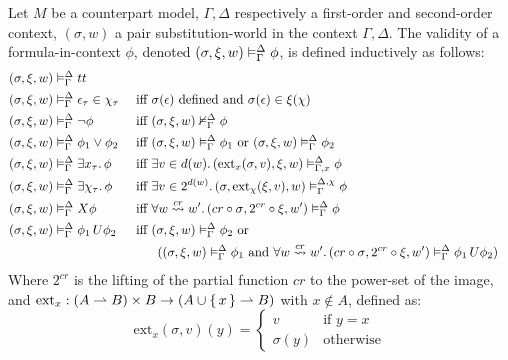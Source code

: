 \begin{definition}
Let $M$ be a counterpart model, $\Gamma,\Delta$ respectively a first-order and second-order context, $(\sigma, w)$ a
pair substitution-world in the context $\Gamma,\Delta$.
The validity of a formula-in-context $\phi$, denoted $({\sigma}, {\xi}, {w}) \vDash_{\Gamma}^{\Delta} {\phi}$, is defined inductively as follows:
\begin{align*}
  (\sigma, \xi, w) &\vDash_\Gamma^\Delta tt \\
  (\sigma, \xi, w) &\vDash_\Gamma^\Delta \epsilon_\tau \in \chi_\tau
      &&\text{ iff $\sigma(\epsilon)$ defined and } \sigma(\epsilon) \in \xi(\chi) \\
  (\sigma, \xi, w) &\vDash_\Gamma^\Delta \neg\phi
      &&\text{ iff } ({\sigma}, {\xi}, {w}) \nvDash_{\Gamma}^{\Delta} {\phi} \\
  (\sigma, \xi, w) &\vDash_\Gamma^\Delta \phi_1 \lor \phi_2
      &&\text{ iff } ({\sigma}, {\xi}, {w}) \vDash_{\Gamma}^{\Delta} {\phi_1} \text{ or }
      ({\sigma}, {\xi}, {w}) \vDash_{\Gamma}^{\Delta} {\phi_2} \\
  (\sigma, \xi, w) &\vDash_\Gamma^\Delta \exists {x_\tau} \ldotp {\phi}
      &&\text{ iff } \exists {v \in d(w)} \ldotp {({\text{ext}_{x}({\sigma},{v})}, {\xi}, {w}) \vDash_{\Gamma, x}^{\Delta} {\phi}} \\
  (\sigma, \xi, w) &\vDash_\Gamma^\Delta \exists {\chi_\tau} \ldotp {\phi}
      &&\text{ iff } \exists {v \in 2^{d(w)}} \ldotp {({\sigma}, {\text{ext}_{\chi}({\xi},{v})}, {w}) \vDash_{\Gamma}^{\Delta,\chi} {\phi}} \\
  (\sigma, \xi, w) &\vDash_\Gamma^\Delta X{\phi}
      &&\text{ iff } \forall {w \overset{cr}{\rightsquigarrow} w'} \ldotp {({cr \circ \sigma}, {2^{cr} \circ \xi}, {w'}) \vDash_{\Gamma}^{\Delta} {\phi}} \\
 (\sigma, \xi, w) &\vDash_\Gamma^\Delta {\phi_1}\,U {\phi_2}
     &&\text{ iff } ({\sigma}, {\xi}, {w}) \vDash_{\Gamma}^{\Delta} {\phi_2} \text{ or } \\
     &&&\qquad(({\sigma}, {\xi}, {w}) \vDash_{\Gamma}^{\Delta} {\phi_1}
         \text { and } \forall {w \overset{cr}{\rightsquigarrow} w'} \ldotp {({cr \circ \sigma}, {2^{cr} \circ \xi}, {w'}) \vDash_{\Gamma}^{\Delta} {{\phi_1}\,U {\phi_2}}}) \\
\end{align*}
Where $2^{cr}$ is the lifting of the partial function $cr$ to the power-set of the image, and
$\text{ext}_x : (A \rightharpoonup B) \times B \to (A \cup \set{x} \rightharpoonup B)$ with $x \not\in A$, defined as:
\[
  \text{ext}_x(\sigma, v)(y) = \begin{cases} v & \text{if } y = x \\ \sigma(y) & \text{otherwise}\end{cases}
\]
\end{definition}

